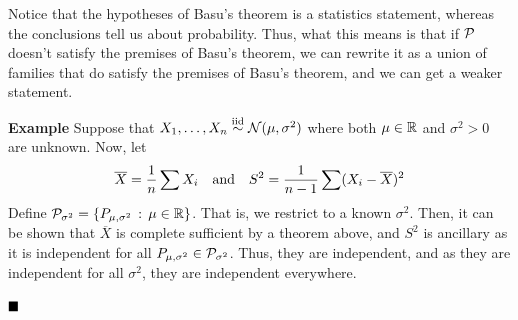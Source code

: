 Notice that the hypotheses of Basu's theorem is a statistics statement, whereas the conclusions tell us about probability. Thus, what this means is that if $\cal{P}$ doesn't satisfy the premises of Basu's theorem, we can rewrite it as a union of families that do satisfy the premises of Basu's theorem, and we can get a weaker statement. 

\begin{example}{\textbf{Example}}
    Suppose that $X_1, \ldots, X_n \iidsim \cal{N}(\mu, \sigma^2)$ where both $\mu \in \R$ and $\sigma^2 > 0$ are unknown. Now, let
    \[ \overline{X} = \frac{1}{n}\sum X_i \quand S^2 = \frac{1}{n - 1}\sum (X_i - \overline{X})^2 \]
    Define $\cal{P}_{\sigma^2} = \{P_{\mu, \sigma^2} \col \mu \in \R\}$. That is, we restrict to a known $\sigma^2$. Then, it can be shown that $\overline{X}$ is complete sufficient by a theorem above, and $S^2$ is ancillary as it is independent for all $P_{\mu, \sigma^2} \in \cal{P}_{\sigma^2}$. Thus, they are independent, and as they are independent for all $\sigma^2$, they are independent everywhere.

    $\qed$
\end{example}

